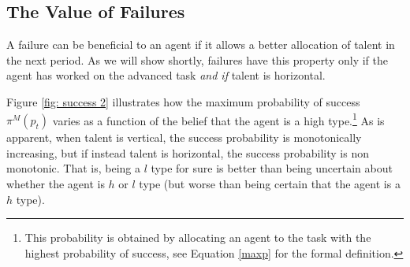 \documentclass[12pt,american]{paper}
\theoremstyle{remark}
\begin{document}

\subsection{The Value of Failures}
A failure can be beneficial to an agent if it allows a better allocation of talent in the next period. As we will show shortly, failures have this property only if the agent has worked on the advanced task  \textit{and if} talent is horizontal. 

 Figure \ref{fig: success 2} illustrates how the maximum probability of success $\pi^M(p_t)$  varies as a function of the belief that the agent is a high type.\footnote{This probability is obtained by allocating an agent to the task with the highest probability of success, see Equation \ref{maxp} for the formal definition.} As is apparent,  when talent is vertical, the success probability is monotonically increasing, but if instead talent is horizontal, the success probability is non monotonic. That is, being  a $l$ type  for sure is better than being uncertain about whether the agent is $h$ or $l$ type (but worse than being certain that the agent is a $h$ type).
\end{document}
